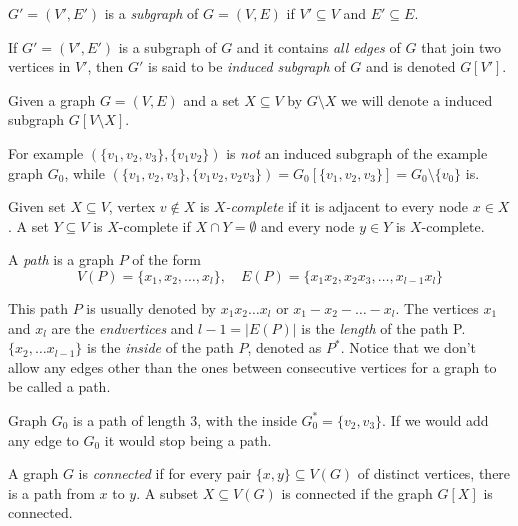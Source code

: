 \begin{defn}[subgraph]
  $G' = (V', E')$ is a \emph{subgraph} of $G = (V, E)$ if $V' \subseteq V$ and $E' \subseteq E$.
\end{defn}

\begin{defn}
  If $G' = (V', E')$ is a subgraph of $G$ and it contains \emph{all edges} of $G$ that join two vertices in $V'$, then $G'$ is said to be \emph{induced subgraph} of $G$ and is denoted $G[V']$.
\end{defn}

Given a graph $G = (V, E)$ and a set $X \subseteq V$ by $G\setminus X$ we will denote a induced subgraph $G[V\setminus X]$.

For example $(\{v_1, v_2, v_3\}, \{v_1v_2\})$ is \emph{not} an induced subgraph of the example graph $G_0$, while $(\{v_1, v_2, v_3\}, \{v_1v_2, v_2v_3\}) = G_0[\{v_1, v_2, v_3\}] = G_0 \setminus \{v_0\}$ is.

\begin{defn}[$X$-completeness]
  Given set $X \subseteq V$, vertex $v \notin X$ is \emph{$X$-complete} if it is adjacent to every node $x \in X$. A set $Y \subseteq V$ is $X$-complete if $X \cap Y = \emptyset$ and every node $y \in Y$ is $X$-complete.
\end{defn}

\begin{defn}[path]
  A \emph{path} is a graph $P$ of the form
  \[ V(P) = \{x_1, x_2, \ldots, x_l\},\quad E(P) = \{x_1x_2, x_2x_3, \ldots, x_{l-1}x_l\} \]
\end{defn}
This path $P$ is usually denoted by $x_1x_2\ldots x_l$ or $x_1 - x_2 - \ldots - x_l$. The vertices $x_1$ and $x_l$ are the \emph{endvertices} and ${l-1} = |E(P)|$ is the \emph{length} of the path P. $\{x_2, \ldots x_{l-1}\}$ is the \emph{inside} of the path $P$, denoted as $P^*$. Notice that we don't allow any edges other than the ones between consecutive vertices for a graph to be called a path.

Graph $G_0$ is a path of length 3, with the inside $G_0^* = \{v_2, v_3\}$. If we would add any edge to $G_0$ it would stop being a path.


\begin{defn}
  A graph $G$ is \emph{connected} if for every pair $\{x, y\} \subseteq V(G)$ of distinct vertices, there is a path from $x$ to $y$.
  A subset $X \subseteq V(G)$ is connected if the graph $G[X]$ is connected.
\end{defn}

